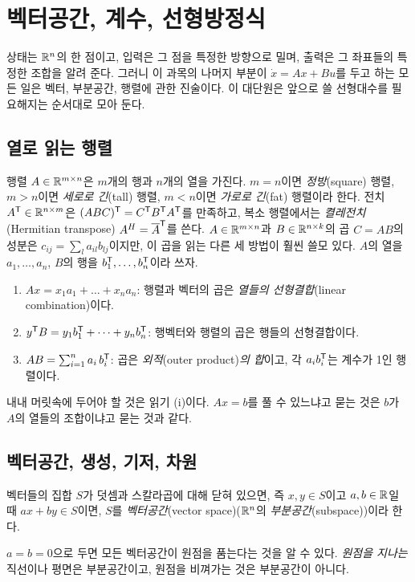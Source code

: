 \documentclass[11pt]{article}
\begin{document}


\section{벡터공간, 계수, 선형방정식}\label{sec:vspace}

상태는 $\mathbb{R}^{n}$의 한 점이고, 입력은 그 점을 특정한 방향으로 밀며, 출력은 그 좌표들의
특정한 조합을 알려 준다. 그러니 이 과목의 나머지 부분이 $\dot x=Ax+Bu$를 두고 하는
모든 일은 벡터, 부분공간, 행렬에 관한 진술이다. 이 대단원은 앞으로 쓸 선형대수를
필요해지는 순서대로 모아 둔다.

\subsection{열로 읽는 행렬}
행렬 $A\in\mathbb{R}^{m\times n}$은 $m$개의 행과 $n$개의 열을 가진다. $m=n$이면
\emph{정방}(square) 행렬, $m>n$이면 \emph{세로로 긴}(tall) 행렬, $m<n$이면
\emph{가로로 긴}(fat) 행렬이라 한다. 전치 $A^{\mathsf{T}}\in\mathbb{R}^{n\times m}$은
$(ABC)^{\mathsf{T}}=C^{\mathsf{T}} B^{\mathsf{T}} A^{\mathsf{T}}$를 만족하고, 복소 행렬에서는 \emph{켤레전치}(Hermitian
transpose) $A^{H}=\overline{A}^{\mathsf{T}}$를 쓴다. $A\in\mathbb{R}^{m\times n}$과
$B\in\mathbb{R}^{n\times k}$의 곱 $C=AB$의 성분은 $c_{ij}=\sum_{l}a_{il}b_{lj}$이지만, 이
곱을 읽는 다른 세 방법이 훨씬 쓸모 있다. $A$의 열을 $a_1,\dots,a_n$, $B$의 행을
$b_1^{\mathsf{T}},\dots,b_n^{\mathsf{T}}$이라 쓰자.
\begin{enumerate}[label=(\roman*),itemsep=2pt]
\item $Ax = x_1a_1+\dots+x_na_n$: 행렬과 벡터의 곱은 \emph{열들의 선형결합}(linear
combination)이다.
\item $y^{\mathsf{T}} B = y_1b_1^{\mathsf{T}}+\dots+y_nb_n^{\mathsf{T}}$: 행벡터와 행렬의 곱은 행들의
선형결합이다.
\item $AB = \sum_{i=1}^{n} a_i\,b_i^{\mathsf{T}}$: 곱은 \emph{외적}(outer product)\emph{의
합}이고, 각 $a_ib_i^{\mathsf{T}}$는 계수가 1인 행렬이다.
\end{enumerate}
내내 머릿속에 두어야 할 것은 읽기 (i)이다. $Ax=b$를 풀 수 있느냐고 묻는 것은 $b$가
$A$의 열들의 조합이냐고 묻는 것과 같다.

\subsection{벡터공간, 생성, 기저, 차원}
\begin{definition}[벡터공간]
벡터들의 집합 $S$가 덧셈과 스칼라곱에 대해 닫혀 있으면, 즉 $x,y\in S$이고
$a,b\in\mathbb{R}$일 때 $ax+by\in S$이면, $S$를 \emph{벡터공간}(vector space)($\mathbb{R}^{n}$의
\emph{부분공간}(subspace))이라 한다.
\end{definition}
$a=b=0$으로 두면 모든 벡터공간이 원점을 품는다는 것을 알 수 있다. \emph{원점을
지나는} 직선이나 평면은 부분공간이고, 원점을 비껴가는 것은 부분공간이 아니다.
\end{document}
